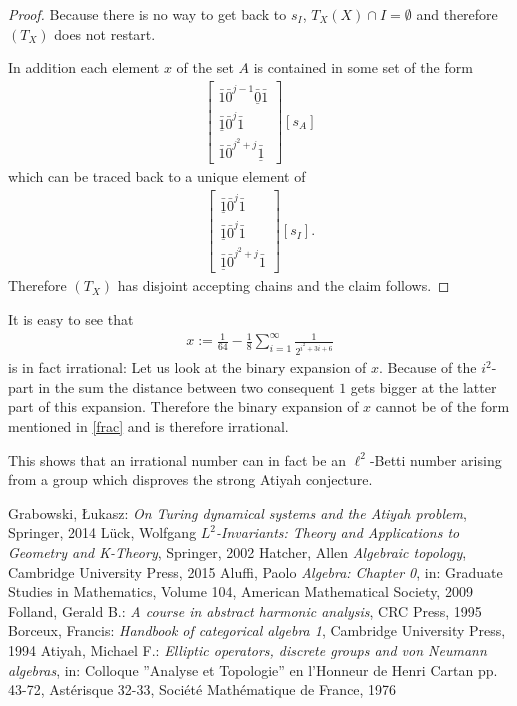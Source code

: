 \documentclass[12pt,a4paper]{scrartcl}
\theoremstyle{plain}
\theoremstyle{definition}
\newcommand{\2}{\mathbb{Z} / 2 \mathbb{Z}}
\newcommand{\1}{\bar{1}}
\newcommand{\0}{\bar{0}}
\begin{document}
\begin{proof}
	Because there is no way to get back to $s_I$, $T_X(X) \cap I = \emptyset$ and therefore $(T_X)$ does not restart.
	
	In addition each element $x$ of the set $A$ is contained in some set of the form
	\begin{align*}
		\begin{bmatrix}
			\1 \0^{j - 1} \underline{\0} \1 \\
			\underline{\1} \0^j \1 \\
			\1 \0^{j^2 + j} \underline{\1}
		\end{bmatrix}[s_A]
	\end{align*}
	which can be traced back to a unique element of 
	\begin{align*}
		\begin{bmatrix}
			\underline{\1} \0^j \1 \\
			\underline{\1} \0^j \1 \\
			\underline{\1} \0^{j^2 + j} \1
		\end{bmatrix}[s_I].
	\end{align*}
	Therefore $(T_X)$ has disjoint accepting chains and the claim follows.
\end{proof}

It is easy to see that
\begin{align*}
	x := \frac{1}{64} - \frac{1}{8} \sum_{i = 1}^{\infty} \frac{1}{2^{i^2 + 3i + 6}}
\end{align*}
is in fact irrational:
Let us look at the binary expansion of $x$. Because of the $i^2$-part in the sum the distance between two consequent $1$ gets bigger at the latter part of this expansion. Therefore the binary expansion of $x$ cannot be of the form mentioned in \ref{frac} and is therefore irrational.

This shows that an irrational number can in fact be an $\ell^2$-Betti number arising from a group which disproves the strong Atiyah conjecture.


  \newpage

\begin{thebibliography}{Lam00}
  Grabowski, \L ukasz: \emph{On Turing dynamical systems and the Atiyah problem}, Springer, 2014
  Lück, Wolfgang $L^2$\emph{-Invariants: Theory and Applications to Geometry and K-Theory}, Springer, 2002
  Hatcher, Allen \emph{Algebraic topology}, Cambridge University Press, 2015
  Aluffi, Paolo \emph{Algebra: Chapter 0}, in: Graduate Studies in Mathematics, Volume 104, American Mathematical Society, 2009
  Folland, Gerald B.: \emph{A course in abstract harmonic analysis}, CRC Press, 1995
  Borceux, Francis: \emph{Handbook of categorical algebra 1}, Cambridge University Press, 1994
  Atiyah, Michael F.: \emph{Elliptic operators, discrete groups and von Neumann algebras}, in: Colloque ''Analyse et Topologie'' en l'Honneur de Henri Cartan pp. 43-72, Ast\'erisque 32-33, Soci\'et\'e Math\'ematique de France, 1976
\end{thebibliography}
 
\end{document}
